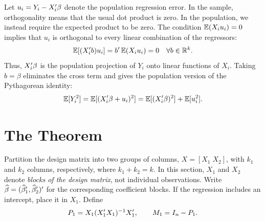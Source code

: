 \documentclass[a4paper,12pt]{article}
\begin{document}
\begin{remark}
	Let $u_i=Y_i-X_i^{\prime}\beta$ denote the population regression error.
	In the sample, orthogonality means that the usual dot product is zero.
	In the population, we instead require the expected product to be zero.
	The condition $\operatorname{\mathbb{E}}(X_i u_i)=0$ implies that $u_i$ is orthogonal to every linear combination of the regressors:
	\begin{align}
		\operatorname{\mathbb{E}}[(X_i^{\prime} b)u_i]=b^{\prime}\operatorname{\mathbb{E}}(X_i u_i)=0
		\quad\forall b\in\mathbb{R}^k.
	\end{align}
	Thus, $X_i^{\prime}\beta$ is the population projection of $Y_i$ onto linear functions of $X_i$.
	Taking $b=\beta$ eliminates the cross term and gives the population version of the Pythagorean identity:
	\begin{align}
		\operatorname{\mathbb{E}}[Y_i^2]
		= \operatorname{\mathbb{E}}[(X_i^{\prime}\beta + u_i)^2]
		= \operatorname{\mathbb{E}}[(X_i^{\prime}\beta)^2] + \operatorname{\mathbb{E}}[u_i^2].
	\end{align}
\end{remark}

\section{The  Theorem}

Partition the design matrix into two groups of columns, $X=[X_1\;X_2]$,
with $k_1$ and $k_2$ columns, respectively, where $k_1+k_2=k$.
In this section, $X_1$ and $X_2$ denote \emph{blocks of the design matrix}, not individual observations.
Write $\widehat\beta=(\widehat\beta_1^{\prime},\widehat\beta_2^{\prime})^{\prime}$ for the corresponding coefficient blocks.
If the regression includes an intercept, place it in $X_1$.
Define
\begin{align}
	P_1=X_1(X_1^{\prime} X_1)^{-1} X_1^{\prime},
	\qquad M_1=I_n-P_1.
\end{align}
\end{document}
